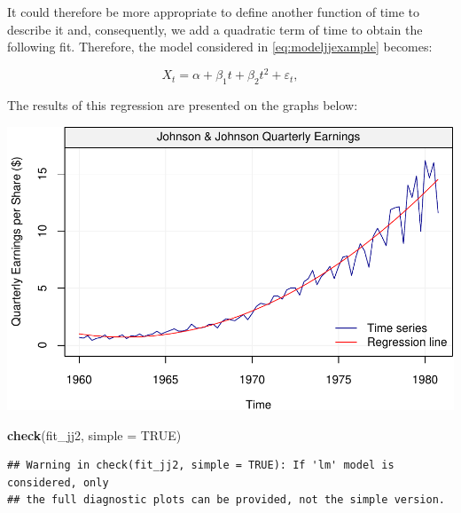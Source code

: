 \documentclass[]{book}
\newenvironment{Shaded}{\begin{snugshade}}{\end{snugshade}}
\newcommand{\KeywordTok}[1]{\textcolor[rgb]{0.13,0.29,0.53}{\textbf{#1}}}
\newcommand{\DataTypeTok}[1]{\textcolor[rgb]{0.13,0.29,0.53}{#1}}
\newcommand{\OtherTok}[1]{\textcolor[rgb]{0.56,0.35,0.01}{#1}}
\newcommand{\NormalTok}[1]{#1}
\theoremstyle{definition}
\theoremstyle{definition}
\theoremstyle{definition}
\theoremstyle{remark}
\begin{document}
It could therefore be more appropriate to define another function of
time to describe it and, consequently, we add a quadratic term of time
to obtain the following fit. Therefore, the model considered in
\eqref{eq:modeljjexample} becomes:

\begin{equation} 
X_t = \alpha + \beta_1 t + \beta_2 t^2 + \varepsilon_t,
\label{eq:modeljjexample2}
\end{equation}

The results of this regression are presented on the graphs below:

\begin{center}\includegraphics{ts_files/figure-latex/unnamed-chunk-16-1} \end{center}

\begin{Shaded}
\begin{Highlighting}[]
\KeywordTok{check}\NormalTok{(fit_jj2, }\DataTypeTok{simple =} \OtherTok{TRUE}\NormalTok{)}
\end{Highlighting}
\end{Shaded}

\begin{verbatim}
## Warning in check(fit_jj2, simple = TRUE): If 'lm' model is considered, only
## the full diagnostic plots can be provided, not the simple version.
\end{verbatim}
\end{document}
